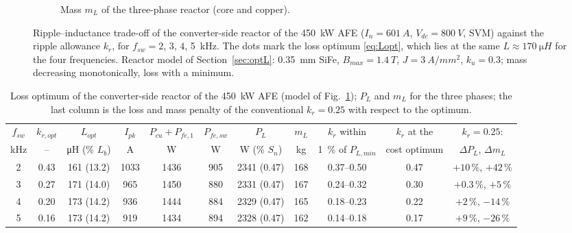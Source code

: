 \documentclass[10pt,a4paper]{scrartcl}
\newcommand{\Vdc}{V_{dc}}
\newcommand{\fsw}{f_{sw}}
\begin{document}
\begin{onehalfspace}
\begin{figure}[htb]
\begin{subfigure}{\textwidth}
\caption{Mass $m_L$ of the three-phase reactor (core and copper).}
\end{subfigure}
\caption{Ripple--inductance trade-off of the converter-side reactor of the \SI{450}{kW} AFE ($I_n = \SI{601}{A}$, $\Vdc = \SI{800}{V}$, SVM) against the ripple allowance $k_r$, for $\fsw = 2$, $3$, $4$, \SI{5}{kHz}. The dots mark the loss optimum \eqref{eq:Lopt}, which lies at the same $L \approx \SI{170}{\micro H}$ for the four frequencies. Reactor model of Section~\ref{sec:optL}: \SI{0.35}{mm} SiFe, $B_{max} = \SI{1.4}{T}$, $J = \SI{3}{A/mm^2}$, $k_u = 0.3$; mass decreasing monotonically, loss with a minimum.}
\label{fig:optL}
\end{figure}

\begin{table}[htb]
\centering\small\begin{onehalfspace}
\setlength{\tabcolsep}{3.5pt}
\caption{Loss optimum of the converter-side reactor of the \SI{450}{kW} AFE (model of Fig.~\ref{fig:optL}); $P_L$ and $m_L$ for the three phases; the last column is the loss and mass penalty of the conventional $k_r = 0.25$ with respect to the optimum.}
\label{tab:optL}
\begin{tabular}{@{}c c c c c c c c c c c@{}}
\toprule
$\fsw$ & $k_{r,opt}$ & $L_{opt}$ & $I_{pk}$ & $P_{cu} + P_{fe,1}$ & $P_{fe,sw}$ & $P_L$ & $m_L$ & $k_r$ within & $k_r$ at the & $k_r = 0.25$: \\
kHz & -- & \si{\micro H} (\% $L_b$) & A & W & W & W (\% $S_n$) & kg & \SI{1}{\percent} of $P_{L,min}$ & cost optimum & $\Delta P_L$, $\Delta m_L$ \\
\midrule
2 & 0.43 & 161 (13.2) & 1033 & 1436 & 905 & 2341 (0.47) & 168 & 0.37--0.50 & 0.47 & $+10\,\%$, $+42\,\%$ \\
3 & 0.27 & 171 (14.0) & 965  & 1450 & 880 & 2331 (0.47) & 167 & 0.24--0.32 & 0.30 & $+0.3\,\%$, $+5\,\%$ \\
4 & 0.20 & 173 (14.2) & 936  & 1444 & 884 & 2329 (0.47) & 165 & 0.18--0.23 & 0.22 & $+2\,\%$, $-14\,\%$ \\
5 & 0.16 & 173 (14.2) & 919  & 1434 & 894 & 2328 (0.47) & 162 & 0.14--0.18 & 0.17 & $+9\,\%$, $-26\,\%$ \\
\bottomrule
\end{tabular}
\end{onehalfspace}
\end{table}


\end{onehalfspace}
\end{document}
